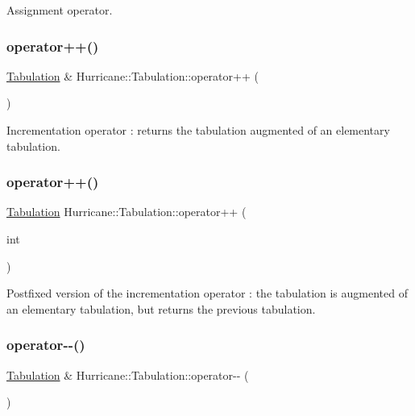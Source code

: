 Assignment operator. \mbox{\label{classHurricane_1_1Tabulation_ad108353099b0755a45a18ec1ab6c0b7c}} 
\subsubsection{\texorpdfstring{operator++()}{operator++()}\hspace{0.1cm}{\footnotesize\ttfamily [1/2]}}
{\footnotesize\ttfamily \hyperlink{classHurricane_1_1Tabulation}{Tabulation} \& Hurricane\+::\+Tabulation\+::operator++ (\begin{DoxyParamCaption}{ }\end{DoxyParamCaption})}

Incrementation operator \+: returns the tabulation augmented of an elementary tabulation. \mbox{\label{classHurricane_1_1Tabulation_ae609e34474086ac1b9748368d798acae}} 
\subsubsection{\texorpdfstring{operator++()}{operator++()}\hspace{0.1cm}{\footnotesize\ttfamily [2/2]}}
{\footnotesize\ttfamily \hyperlink{classHurricane_1_1Tabulation}{Tabulation} Hurricane\+::\+Tabulation\+::operator++ (\begin{DoxyParamCaption}\item[{int}]{ }\end{DoxyParamCaption})}

Postfixed version of the incrementation operator \+: the tabulation is augmented of an elementary tabulation, but returns the previous tabulation. \mbox{\label{classHurricane_1_1Tabulation_af95446070605eb5d2ce89e9b8b3049be}} 
\subsubsection{\texorpdfstring{operator-\/-\/()}{operator--()}\hspace{0.1cm}{\footnotesize\ttfamily [1/2]}}
{\footnotesize\ttfamily \hyperlink{classHurricane_1_1Tabulation}{Tabulation} \& Hurricane\+::\+Tabulation\+::operator-\/-\/ (\begin{DoxyParamCaption}{ }\end{DoxyParamCaption})}

